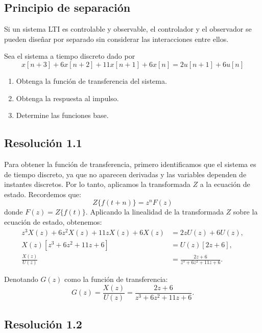 \documentclass[
  11pt,
  letterpaper,
   addpoints,
  answers
  ]{exam}
\begin{document}
\subsection*{Principio de separación}
Si un sistema LTI es controlable y observable, el controlador y el observador se pueden diseñar por separado sin considerar las interacciones entre ellos.
\newpage
\begin{questions}
  \question Sea el sistema a tiempo discreto dado por
\begin{equation*}
  x[n+3] + 6x[n+2] + 11x[n+1] + 6x[n] = 2u[n+1] + 6u[n]
\end{equation*}
\begin{enumerate}
  \item Obtenga la función de transferencia del sistema.
  \item Obtenga la respuesta al impulso.
  \item Determine las funciones base.
\end{enumerate}
\begin{solution}
\subsection*{Resolución 1.1}
Para obtener la función de transferencia, primero identificamos que el sistema es de tiempo discreto, ya que no aparecen derivadas y las variables dependen de instantes discretos. Por lo tanto, aplicamos la transformada $Z$ a la ecuación de estado. Recordemos que:
\begin{equation}
Z\{f(t+n)\} = z^n F(z)
\end{equation}
donde $F(z) = Z\{f(t)\}$. Aplicando la linealidad de la transformada $Z$ sobre la ecuación de estado, obtenemos:
\begin{align}
z^{3}X(z) + 6z^{2}X(z) + 11zX(z) + 6X(z) &= 2zU(z) + 6U(z), \\
X(z)\left[z^3 + 6z^2 + 11z + 6 \right] &= U(z)[2z+6], \\
\frac{X(z)}{U(z)} &= \frac{2z+6}{z^3+6z^2+11z+6}.
\end{align}

Denotando $G(z)$ como la función de transferencia:
\begin{equation}
G(z) = \frac{X(z)}{U(z)} = \frac{2z+6}{z^3+6z^2+11z+6}.
\end{equation}

\subsection*{Resolución 1.2}


\end{solution}
\end{questions}
\end{document}
